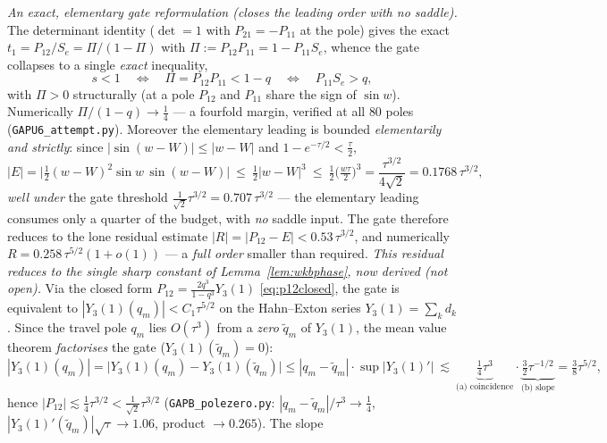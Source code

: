 \begin{remark}[The assembly: $R=O(\tau^{5/2})$ via the q-Bessel stationary-phase asymptotic coupled to the
travel-block phase]
\emph{An exact, elementary gate reformulation \textup(closes the leading order with no saddle\textup).}
The determinant identity ($\det=1$ with $P_{21}=-P_{11}$ at the pole) gives the exact
$t_1=P_{12}/S_e=\Pi/(1-\Pi)$ with $\Pi:=P_{12}P_{11}=1-P_{11}S_e$, whence the gate collapses to a single
\emph{exact} inequality,
\begin{equation}\label{eq:gatePi}
   s<1\quad\Longleftrightarrow\quad \Pi=P_{12}P_{11}<1-q\quad\Longleftrightarrow\quad P_{11}S_e>q,
\end{equation}
with $\Pi>0$ structurally (at a pole $P_{12}$ and $P_{11}$ share the sign of $\sin w$). Numerically
$\Pi/(1-q)\to\tfrac14$ --- a fourfold margin, verified at all $80$ poles (\texttt{GAPU6\_attempt.py}). Moreover the
elementary leading is bounded \emph{elementarily and strictly}: since $|\sin(w-W)|\le|w-W|$ and
$1-e^{-\tau/2}<\tfrac\tau2$,
\begin{equation}\label{eq:Ebound}
   |E|=\bigl|\tfrac12(w-W)^2\sin w\,\sin(w-W)\bigr|\ \le\ \tfrac12|w-W|^3\ \le\ \tfrac12\bigl(\tfrac{w\tau}2\bigr)^3
   =\frac{\tau^{3/2}}{4\sqrt2}=0.1768\,\tau^{3/2},
\end{equation}
\emph{well under} the gate threshold $\tfrac1{\sqrt2}\tau^{3/2}=0.707\,\tau^{3/2}$ --- the elementary leading
consumes only a quarter of the budget, with \emph{no} saddle input. The gate therefore reduces to the lone
residual estimate $|R|=|P_{12}-E|<0.53\,\tau^{3/2}$, and numerically $R=0.258\,\tau^{5/2}(1+o(1))$ --- a
\emph{full order} smaller than required. \emph{This residual reduces to the single sharp constant of
Lemma~\ref{lem:wkbphase}, now derived \textup(not open\textup).} Via the
closed form $P_{12}=\tfrac{2q^3}{1-q^3}Y_3(1)$ \eqref{eq:p12closed}, the gate is equivalent to
$|Y_3(1)(q_m)|<C_1\tau^{5/2}$ on the Hahn--Exton series $Y_3(1)=\sum_kd_k$. Since the travel pole $q_m$ lies
$O(\tau^3)$ from a \emph{zero} $\tilde q_m$ of $Y_3(1)$, the mean value theorem \emph{factorises} the gate
($Y_3(1)(\tilde q_m)=0$):
\begin{equation}\label{eq:polezero}
   |Y_3(1)(q_m)|=\bigl|Y_3(1)(q_m)-Y_3(1)(\tilde q_m)\bigr|\le|q_m-\tilde q_m|\cdot\!\sup|Y_3(1)'|
   \ \lesssim\ \underbrace{\tfrac14\tau^3}_{\text{(a) coincidence}}\cdot\underbrace{\tfrac32\tau^{-1/2}}_{\text{(b) slope}}
   =\tfrac38\tau^{5/2},
\end{equation}
hence $|P_{12}|\lesssim\tfrac14\tau^{3/2}<\tfrac1{\sqrt2}\tau^{3/2}$ \textup(\texttt{GAPB\_polezero.py}:
$|q_m-\tilde q_m|/\tau^3\to\tfrac14$, $|Y_3(1)'(\tilde q_m)|\sqrt\tau\to1.06$, product $\to0.265$\textup). The slope

\end{remark}
